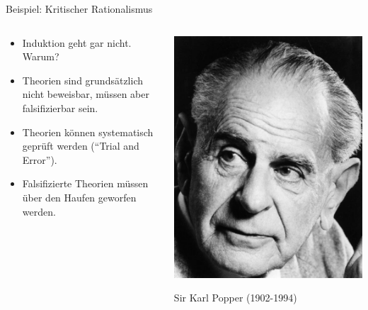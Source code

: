 \documentclass{beamer}
\begin{document}
\begin{frame}{Beispiel: Kritischer Rationalismus}

\begin{columns}[c]

\begin{column}{5cm}

\begin{itemize}
    \item 
Induktion geht gar nicht. \textcolor{theme}{Warum?}
\item 
Theorien sind grundsätzlich nicht beweisbar, müssen aber falsifizierbar sein.
\item 
Theorien können systematisch geprüft werden (``Trial and Error''). 
\item 
Falsifizierte Theorien müssen über den Haufen geworfen werden.

    
\end{itemize}

    
\end{column}

\begin{column}{5cm}

\includegraphics[width=\textwidth]{Karl_Popper.jpg}


Sir Karl Popper (1902-1994)
    
\end{column}



    
\end{columns}

\end{frame}
\end{document}
